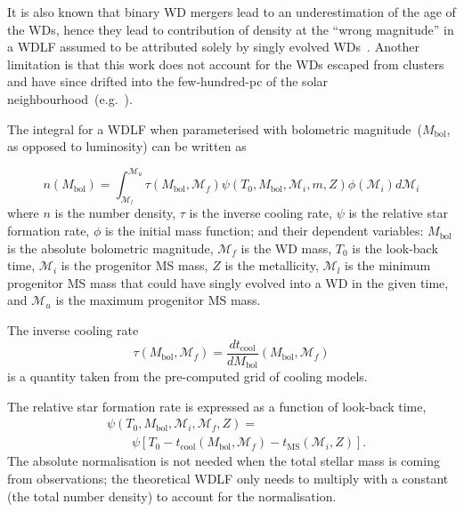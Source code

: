 \documentclass[fleqn,usenatbib]{rasti}
\begin{document}
It is also known that binary WD mergers lead to
an underestimation of the age of the WDs, hence they lead to contribution of
density at the ``wrong magnitude'' in a WDLF assumed to be attributed solely
by singly evolved WDs~\citep{2020A&A...636A..31T}. Another limitation is that
this work does not account for the WDs escaped from clusters and have since
drifted into the few-hundred-pc of the solar neighbourhood~(e.g.\
\citealt{2013ApJ...770..140Z,2022ApJ...926..132H, 2022ApJ...926L..24M}).

The integral for a WDLF when parameterised with bolometric
magnitude~($M_\mathrm{bol}$, as opposed to luminosity) can be written as

\begin{equation}
    n(M_{\mathrm{bol}}) = \int_{\mathcal{M}_l}^{\mathcal{M}_u}
        \tau(M_\mathrm{bol}, \mathcal{M}_f)
        \psi(T_0, M_\mathrm{bol}, \mathcal{M}_i, m, Z)
        \phi(\mathcal{M}_i) d\mathcal{M}_i
\end{equation}
where $n$ is the number density, $\tau$ is the inverse cooling rate, $\psi$ is
the relative star formation rate, $\phi$ is the initial mass function; and their
dependent variables: $M_\mathrm{bol}$ is the absolute bolometric
magnitude, $\mathcal{M}_f$ is the WD mass, $T_0$ is the look-back time, $\mathcal{M}_i$ is
the progenitor MS mass, $Z$ is the metallicity, $\mathcal{M}_l$ is the minimum
progenitor MS mass that could have singly evolved into a WD in the given time,
and $\mathcal{M}_u$ is the maximum progenitor MS mass.

The inverse cooling rate
\begin{equation}
    \tau(M_\mathrm{bol}, \mathcal{M}_f) = \dfrac{dt_{\mathrm{cool}}}{dM_\mathrm{bol}} \left( M_\mathrm{bol}, \mathcal{M}_f \right)
\end{equation}
is a quantity taken from the pre-computed grid of cooling models. 

The relative star formation rate is expressed as a function of look-back time,
\begin{align}
    &\psi(T_0, M_\mathrm{bol}, \mathcal{M}_i, \mathcal{M}_f, Z) =\\
    &\qquad\psi\left[T_0 - t_{\mathrm{cool}}\left(M_\mathrm{bol}, \mathcal{M}_f\right) - t_{\mathrm{MS}}\left(\mathcal{M}_i, Z\right)\right].
\end{align}
The absolute normalisation is not needed when the total stellar mass is coming
from observations; the theoretical WDLF only needs to multiply with a
constant (the total number density) to account for the normalisation.
\end{document}

